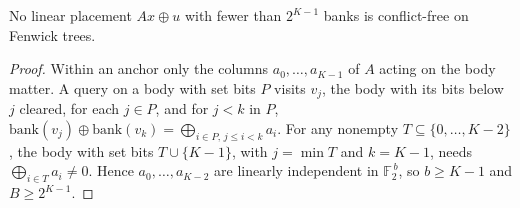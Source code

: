 \begin{theorem}\label{thm:linear}
	No linear placement $Ax \oplus u$ with fewer than $2^{K-1}$ banks is conflict-free on
	Fenwick trees.
\end{theorem}

\begin{proof}
	Within an anchor only the columns $a_0, \ldots, a_{K-1}$ of $A$ acting on the body matter.
	A query on a body with set bits $P$ visits $v_j$, the body with its bits below $j$
	cleared, for each $j \in P$, and for $j < k$ in $P$,
	$\mathrm{bank}(v_j) \oplus \mathrm{bank}(v_k) = \bigoplus_{i \in P,\, j \le i < k} a_i$.
	For any nonempty $T \subseteq \{0, \ldots, K - 2\}$, the body with set bits
	$T \cup \{K - 1\}$, with $j = \min T$ and $k = K - 1$, needs
	$\bigoplus_{i \in T} a_i \ne 0$. Hence $a_0, \ldots, a_{K-2}$ are linearly independent in
	$\mathbb{F}_2^{\,b}$, so $b \ge K - 1$ and $B \ge 2^{K-1}$.
\end{proof}
